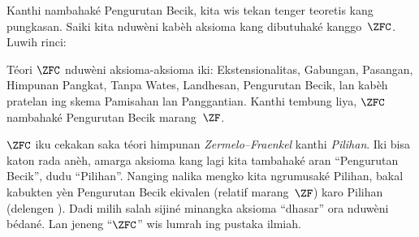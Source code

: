 \documentclass[../../../include/open-logic-section]{subfiles}
\begin{document}

Kanthi nambahaké Pengurutan Becik, kita wis tekan
tenger teoretis kang pungkasan. Saiki kita nduwèni kabèh
aksioma kang dibutuhaké kanggo~$\ZFC$. Luwih rinci:

\begin{defn}
Téori $\ZFC$ nduwèni aksioma-aksioma iki: Ekstensionalitas,
Gabungan, Pasangan, Himpunan Pangkat, Tanpa Wates, Landhesan,
Pengurutan Becik, lan kabèh pratelan ing skema Pamisahan lan
Panggantian. Kanthi tembung liya, $\ZFC$ nambahaké
Pengurutan Becik marang~$\ZF$.
\end{defn}

$\ZFC$ iku cekakan saka téori himpunan
\emph{Zermelo--Fraenkel} kanthi \emph{Pilihan}. Iki bisa katon
rada anèh, amarga aksioma kang lagi kita tambahaké aran
“Pengurutan Becik”, dudu “Pilihan”. Nanging nalika mengko kita
ngrumusaké {Pilihan}, bakal kabukten yèn Pengurutan Becik
ekivalen (relatif marang~$\ZF$) karo Pilihan
(delengen ). Dadi
milih salah sijiné minangka aksioma “dhasar” ora nduwèni
bédané. Lan jeneng “$\ZFC$” wis lumrah ing pustaka ilmiah.
\end{document}
